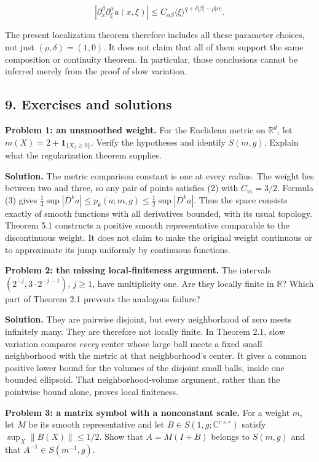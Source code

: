 \documentclass[
  11pt,
]{article}
\begin{document}
\[
|\partial_x^\beta\partial_\xi^\alpha a(x,\xi)|
\leq C_{\alpha\beta}
\langle\xi\rangle^{q+\delta|\beta|-\rho|\alpha|}.             \tag{17}
\]

The present localization theorem therefore includes all these parameter
choices, not just \((\rho,\delta)=(1,0)\). It does not claim that all of
them support the same composition or continuity theorem. In particular,
those conclusions cannot be inferred merely from the proof of slow
variation.

\subsection{9. Exercises and solutions}\label{exercises-and-solutions}

\textbf{Problem 1: an unsmoothed weight.} For the Euclidean metric on
\(\mathbb R^d\), let \(m(X)=2+\mathbf1_{\{X_1\geq0\}}\). Verify the
hypotheses and identify \(S(m,g)\). Explain what the regularization
theorem supplies.

\textbf{Solution.} The metric comparison constant is one at every
radius. The weight lies between two and three, so any pair of points
satisfies (2) with \(C_m=3/2\). Formula (3) gives
\(\frac13\sup|D^ka|\leq p_k(a;m,g)\leq\frac12\sup|D^ka|\). Thus the
space consists exactly of smooth functions with all derivatives bounded,
with its usual topology. Theorem 5.1 constructs a positive smooth
representative comparable to the discontinuous weight. It does not claim
to make the original weight continuous or to approximate its jump
uniformly by continuous functions.

\textbf{Problem 2: the missing local-finiteness argument.} The intervals
\((2^{-j},3\cdot2^{-j-1})\), \(j\geq1\), have multiplicity one. Are they
locally finite in \(\mathbb R\)? Which part of Theorem 2.1 prevents the
analogous failure?

\textbf{Solution.} They are pairwise disjoint, but every neighborhood of
zero meets infinitely many. They are therefore not locally finite. In
Theorem 2.1, slow variation compares \emph{every} center whose large
ball meets a fixed small neighborhood with the metric at that
neighborhood's center. It gives a common positive lower bound for the
volumes of the disjoint small balls, inside one bounded ellipsoid. That
neighborhood-volume argument, rather than the pointwise bound alone,
proves local finiteness.

\textbf{Problem 3: a matrix symbol with a nonconstant scale.} For a
weight \(m\), let \(M\) be its smooth representative and let
\(B\in S(1,g;\mathbb C^{r\times r})\) satisfy \(\sup_X\|B(X)\|\leq1/2\).
Show that \(A=M(I+B)\) belongs to \(S(m,g)\) and that
\(A^{-1}\in S(m^{-1},g)\).
\end{document}
